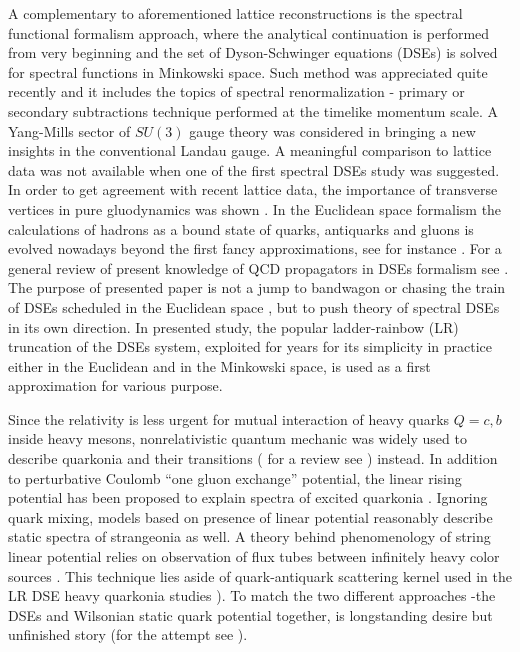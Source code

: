 \documentclass[aps,prd,superscriptaddress,eqsecnum,amsfonts,showpacs,epsfig]{revtex4}
\begin{document}
  A complementary to aforementioned lattice reconstructions is the spectral functional formalism approach, where the analytical continuation is performed from very beginning and the set of Dyson-Schwinger equations (DSEs) is solved for spectral functions in Minkowski space. Such method was appreciated quite recently \cite{s1,s2,SCLK2019,s3,MS2021,HPW2022b} and it includes the topics of spectral renormalization - primary or secondary subtractions technique performed  at the timelike momentum scale. A  Yang-Mills sector of $SU(3)$ gauge theory was considered in \cite{HPPW2021,HPW2022} bringing a new insights  in  the conventional Landau gauge.  A meaningful comparison to  lattice data was not available  when  one of the first  spectral DSEs study \cite{CO1982}  was suggested. In order to get agreement with recent lattice data, the importance of transverse vertices  in pure gluodynamics was shown  \cite{s2}. In the Euclidean space formalism the calculations of hadrons as a bound state of quarks, antiquarks and gluons is evolved nowadays beyond the first fancy approximations, see for instance \cite{ESWAF2016,HFS2020}.  For a general review of present knowledge of QCD propagators  in DSEs formalism see \cite{HUB2020}.  The purpose of presented paper is not a jump to bandwagon or chasing the  train of DSEs scheduled in the Euclidean space \cite{ROWI1994,ALSM353,HUB2020}, but to push theory of spectral DSEs in its own direction. In presented study, the popular ladder-rainbow (LR) truncation of the DSEs system, exploited for years for its simplicity in practice \cite{MARO1997,Sa2008,CK2010,QCLRW2012,FSV2014,TGK2015,HGK2017,HGKL2017,YCKRSX2019} either in the Euclidean and in the Minkowski space,
   is used as a first approximation for various purpose.         
 

    Since the relativity is  less urgent for mutual interaction of heavy quarks $Q=c,b$ inside heavy mesons, nonrelativistic quantum mechanic was widely used to describe quarkonia and their transitions ( for a review see \cite{EGMR2007}) instead. 
In addition to perturbative Coulomb  ``one gluon exchange'' potential, the linear rising potential has been proposed to explain spectra of excited quarkonia \cite{KOSU1974}. Ignoring quark  mixing,    models  based on presence of linear potential reasonably  describe static  spectra of strangeonia \cite{strange2021} as well.  A theory behind phenomenology of string linear potential relies on 
  observation of flux tubes between infinitely heavy color sources \cite{BSS1995}. This technique lies aside 
 of quark-antiquark scattering kernel used in the LR  DSE heavy quarkonia studies \cite{saulieta,saulipsy,HPGK2015}). To match the two different approaches -the DSEs and Wilsonian static quark potential together, is longstanding desire but  unfinished story (for the attempt see \cite{BMCCO2009}).
 
\end{document}
